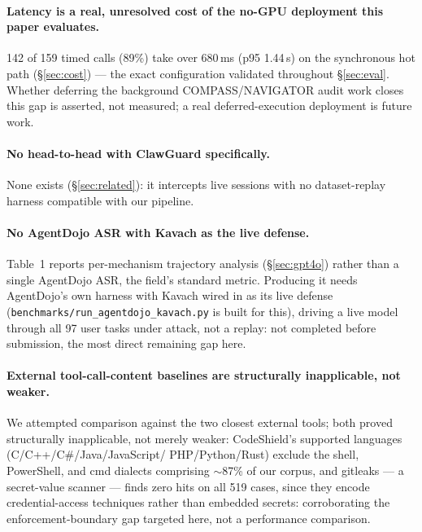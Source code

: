 
\paragraph{Latency is a real, unresolved cost of the no-GPU deployment
this paper evaluates.} 142 of 159 timed calls (89\%) take over 680\,ms
(p95 1.44\,s) on the synchronous hot path (\S\ref{sec:cost}) --- the exact
configuration validated throughout \S\ref{sec:eval}. Whether deferring the
background COMPASS/NAVIGATOR audit work closes this gap is asserted, not
measured; a real deferred-execution deployment is future work.

\paragraph{No head-to-head with ClawGuard specifically.} None exists
(\S\ref{sec:related}): it intercepts live sessions with no dataset-replay
harness compatible with our pipeline.

\paragraph{No AgentDojo ASR with Kavach as the live defense.} Table~1
reports per-mechanism trajectory analysis (\S\ref{sec:gpt4o}) rather than
a single AgentDojo ASR, the field's standard metric. Producing it needs
AgentDojo's own harness with Kavach wired in as its live defense
(\texttt{benchmarks/run\_agentdojo\_kavach.py} is built for this), driving
a live model through all 97 user tasks under attack, not a replay: not
completed before submission, the most direct remaining gap here.

\paragraph{External tool-call-content baselines are structurally
inapplicable, not weaker.}
\label{par:external-baselines}
We attempted comparison against the two closest external tools; both
proved structurally inapplicable, not merely weaker: CodeShield's
supported languages (C/C++/C\#/Java/\allowbreak JavaScript/\allowbreak
PHP/Python/Rust) exclude the shell, PowerShell, and cmd dialects
comprising $\sim$87\% of our corpus, and gitleaks --- a secret-value
scanner --- finds zero hits on all 519 cases, since they encode
credential-access techniques rather than embedded secrets: corroborating
the enforcement-boundary gap targeted here, not a performance comparison.

